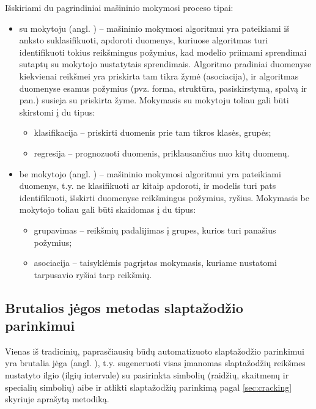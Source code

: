 \documentclass{VUMIFInfBakalaurinis}
\begin{document}
Išskiriami du pagrindiniai mašininio mokymosi proceso tipai:
\begin{itemize}
  \item su mokytoju (angl. ) -- mašininio 
    mokymosi algoritmui yra pateikiami iš anksto suklasifikuoti, apdoroti 
    duomenys, kuriuose algoritmas turi identifikuoti tokius reikšmingus 
    požymius, kad modelio priimami sprendimai sutaptų su mokytojo nustatytais 
    sprendimais.
    Algoritmo pradiniai duomenyse kiekvienai reikšmei yra priskirta tam tikra 
    žymė (asociacija), ir algoritmas duomenyse esamus požymius (pvz. forma, 
    struktūra, pasiskirstymą, spalvą ir pan.) susieja su priskirta žyme. 
    Mokymasis su mokytoju toliau gali būti skirstomi į du tipus:
    \begin{itemize}
      \item klasifikacija -- priskirti duomenis prie tam tikros klasės, grupės;
      \item regresija -- prognozuoti duomenis, priklausančius nuo kitų duomenų.
    \end{itemize}
  \item be mokytojo (angl. ) -- mašininio 
    mokymosi algoritmui yra pateikiami  duomenys, t.y. ne 
    klasifikuoti ar kitaip apdoroti, ir modelis turi pats identifikuoti, 
    išskirti duomenyse reikšmingus požymius, ryšius. Mokymasis be mokytojo 
    toliau gali būti skaidomas į du tipus:
    \begin{itemize}
      \item grupavimas -- reikšmių padalijimas į grupes, kurios turi panašius 
        požymius;
      \item asociacija -- taisyklėmis pagrįstas mokymasis, kuriame nustatomi 
        tarpusavio ryšiai tarp reikšmių.
    \end{itemize}
\end{itemize}

\subsection{Brutalios jėgos metodas slaptažodžio parinkimui} 
\label{sec:bruteforce}
Vienas iš tradicinių, paprasčiausių būdų automatizuoto slaptažodžio parinkimui 
yra brutalia jėga (angl. ), t.y. sugeneruoti visas 
įmanomas slaptažodžių reikšmes nustatyto ilgio (ilgių intervale) su pasirinkta 
simbolių (raidžių, skaitmenų ir specialių simbolių) aibe ir atlikti slaptažodžių 
parinkimą pagal \ref{sec:cracking} skyriuje aprašytą metodiką.
\end{document}
